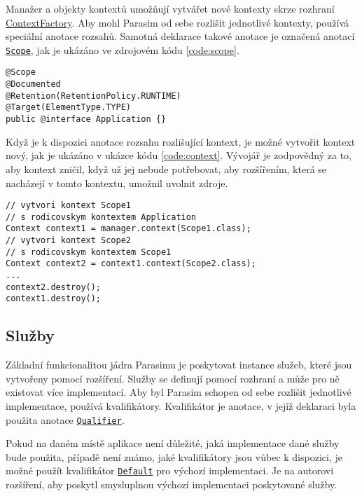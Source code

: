 Manažer a objekty kontextů umožňují vytvářet nové kontexty skrze rozhraní \href{https://github.com/sybila/parasim/blob/2.0.0.Final/core/src/main/java/org/sybila/parasim/core/api/ContextFactory.java}{ContextFactory}.
Aby mohl Parasim od se\-be rozlišit jednotlivé kontexty, používá speciální anotace
rozsahů. Samotná deklarace takové anotace je označená anotací \href{https://github.com/sybila/parasim/blob/2.0.0.Final/core/src/main/java/org/sybila/parasim/core/annotation/Scope.java}{\texttt{Scope}},
jak je ukázáno ve zdrojovém kódu \ref{code:scope}.

\begin{lstlisting}[label={code:scope}, caption={Anotace rozsahu}]
@Scope
@Documented
@Retention(RetentionPolicy.RUNTIME)
@Target(ElementType.TYPE)
public @interface Application {}
\end{lstlisting}

Když je k dispozici anotace rozsahu rozlišující kontext, je možné  vytvořit kontext
nový, jak je ukázáno v ukázce kódu \ref{code:context}. Vývojář je zodpovědný za to,
aby kontext zničil, když už jej nebude potřebovat, aby roz\-ší\-ře\-ním, která se nacházejí
v tomto kontextu, umožnil uvolnit zdroje.

\begin{lstlisting}[label={code:context}, caption={Vytvoření kontextu}]
// vytvori kontext Scope1
// s rodicovskym kontextem Application
Context context1 = manager.context(Scope1.class); 
// vytvori kontext Scope2
// s rodicovskym kontextem Scope1
Context context2 = context1.context(Scope2.class);
...
context2.destroy();
context1.destroy();
\end{lstlisting}

\subsection{Služby}

Základní funkcionalitou jádra Parasimu je poskytovat instance služeb, které jsou
vytvořeny pomocí rozšíření. Služby se definují pomocí rozhraní a může pro ně existovat
více implementací. Aby byl Parasim schopen od sebe rozlišit jednotlivé implementace,
používá kvalifikátory. Kva\-li\-fi\-ká\-tor je anotace, v jejíž deklaraci byla použita anotace
\href{https://github.com/sybila/parasim/blob/2.0.0.Final/core/src/main/java/org/sybila/parasim/core/annotation/Qualifier.java}{\texttt{Qualifier}}.

Pokud na daném místě aplikace není důležité, jaká implementace dané služby bude použita,
případě není známo, jaké kvalifikátory jsou vůbec k dispozici, je možné použít kvalifikátor
\href{https://github.com/sybila/parasim/blob/2.0.0.Final/core/src/main/java/org/sybila/parasim/core/annotation/Default.java}{\texttt{Default}}
pro výchozí implementaci. Je na autorovi rozšíření, aby poskytl smysluplnou výchozí implementaci
poskytované služby.

